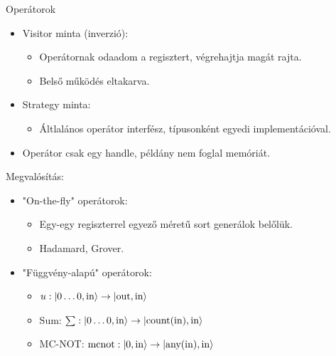 \documentclass[aspectratio=169]{beamer}
\begin{document}
\begin{frame}{Operátorok}

\begin{itemize}
    \item Visitor minta (inverzió):
    \begin{itemize}
        \item Operátornak odaadom a regisztert, végrehajtja magát rajta.
        \item Belső működés eltakarva.
    \end{itemize}
    \item Strategy minta:
    \begin{itemize}
    \item Áltlalános operátor interfész, típusonként egyedi implementációval.
    \end{itemize}
    \item Operátor csak egy handle, példány nem foglal memóriát.
\end{itemize}

Megvalósítás:    
\begin{itemize}
    \item "On-the-fly" operátorok:
    \begin{itemize}
        \item Egy-egy regiszterrel egyező méretű sort generálok belőlük.
        \item Hadamard, Grover.
    \end{itemize}
    \item "Függvény-alapú" operátorok:
    \begin{itemize}
        \item $u: \ket{0\dots{}0,\text{in}} \rightarrow \ket{\text{out},\text{in}}$
        \item Sum: $\sum: \ket{0\dots{}0,\text{in}} \rightarrow \ket{\text{count}(\text{in}),\text{in}}$
        \item MC-NOT: $\text{mcnot}: \ket{0,\text{in}} \rightarrow \ket{\text{any}(\text{in}),\text{in}}$
    \end{itemize}
\end{itemize}


\end{frame}
\end{document}
